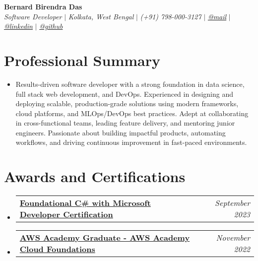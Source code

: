 \documentclass[letterpaper,10pt]{article}
\makeatletter
\newcommand{\sectionspace}{\vspace{-20pt}}
\newcommand{\subheadingtitlevspace}{\vspace{-3pt}}
\newcommand{\titleItem}[1]{\textbf{#1}}
\newcommand{\resumeProjectHeading}[2]{
    \item
    \begin{tabular*}{0.97\textwidth}{l@{\extracolsep{\fill}}r}
        #1 & \textit{ #2} \\
    \end{tabular*}\vspace{-9pt}
}
\newcommand{\resumeSubHeadingListStart}{\subheadingtitlevspace\begin{itemize}[leftmargin=0.15in, label={}]}
\newcommand{\resumeSubHeadingListEnd}{\end{itemize}}
\makeatother
\begin{document}
\begin{flushleft}
    \textbf{\huge Bernard Birendra Das} \\
    \textit{Software Developer} $|$
    \textit{Kolkata, West Bengal} $|$
    \textit{(+91) 798-000-3127} $|$
    \href{mailto:bernardbdas@gmail.com}{{\textit{@mail}}} $|$
    \href{https://linkedin.com/in/bernardbdas}{{\textit{@linkedin}}} $|$
    \href{https://github.com/bernardbdas}{{\textit{@github}}}
    \vspace{-8pt}
\end{flushleft}

\section{Professional Summary}
\vspace{-3pt}
\begin{itemize}[leftmargin=0.15in, label={}]
    \item{Results-driven software developer with a strong foundation in data science, full stack web development, and DevOps. Experienced in designing and deploying scalable, production-grade solutions using modern frameworks, cloud platforms, and MLOps/DevOps best practices. Adept at collaborating in cross-functional teams, leading feature delivery, and mentoring junior engineers. Passionate about building impactful products, automating workflows, and driving continuous improvement in fast-paced environments.}
\end{itemize}
\sectionspace

\section{Awards and Certifications}
    \resumeSubHeadingListStart
        \resumeProjectHeading{\href{https://www.freecodecamp.org/certification/bernardbdas/foundational-c-sharp-with-microsoft}{\titleItem{Foundational C\# with Microsoft Developer Certification}}}{September 2023}
        \resumeProjectHeading{\href{https://www.credly.com/badges/bdf2f146-b8c1-4cc0-b3df-81980f4df784}{\titleItem{AWS Academy Graduate - AWS Academy Cloud Foundations}}}{November 2022}
    \resumeSubHeadingListEnd



% 
% 
\end{document}

